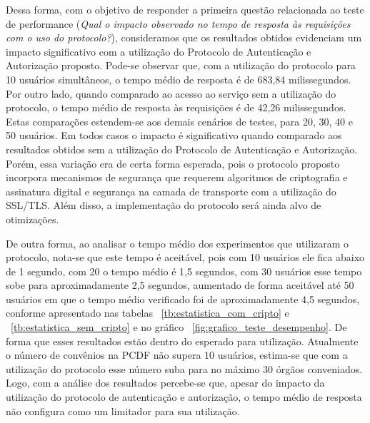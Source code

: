 Dessa forma, com o objetivo de responder a primeira questão relacionada ao teste de performance
(\emph{Qual o impacto observado no tempo de resposta às requisições com o uso do protocolo?}),
consideramos que os resultados obtidos evidenciam um impacto significativo com a utilização do Protocolo de Autenticação e Autorização proposto.
Pode-se observar que, com a utilização do protocolo para 10 usuários simultâneos, o tempo médio de resposta é de 683,84 milissegundos.
Por outro lado, quando comparado ao acesso ao serviço sem a utilização do protocolo, o tempo médio de resposta às requisições é de 42,26 milissegundos.
Estas comparações estendem-se aos demais cen\'{a}rios de testes, para 20, 30, 40 e 50 usuários. Em todos casos o impacto é significativo quando comparado aos resultados obtidos sem a utilização do Protocolo de Autenticação e Autorização. Porém, essa variação era de certa forma esperada, pois o protocolo proposto incorpora mecanismos de segurança que requerem algoritmos de criptografia e assinatura digital e segurança na camada de transporte com a utilização do SSL/TLS. Além disso, a implementação do protocolo será ainda alvo de otimizações.

De outra forma, ao analisar o tempo médio dos experimentos que utilizaram o protocolo, nota-se que este tempo é aceitável, pois com 10 usuários ele fica abaixo de 1 segundo, com 20 o tempo médio é 1,5 segundos, com 30 usuários esse tempo sobe para aproximadamente 2,5 segundos, aumentado de forma aceitável até 50 usuários em que o tempo médio verificado foi de aproximadamente 4,5 segundos, conforme apresentado nas tabelas ~\ref{tb:estatistica_com_cripto} e ~\ref{tb:estatistica_sem_cripto} e no gráfico ~\ref{fig:grafico_teste_desempenho}. De forma que esses resultados estão dentro do esperado para utilização. Atualmente o número de convênios na PCDF não supera 10 usuários, estima-se que com a utilização do protocolo esse número suba para no máximo 30 órgãos conveniados. Logo, com a análise dos resultados percebe-se que, apesar do impacto da utilização do protocolo de autenticação e autorização, o tempo médio de resposta não configura como um limitador para sua utilização. %


